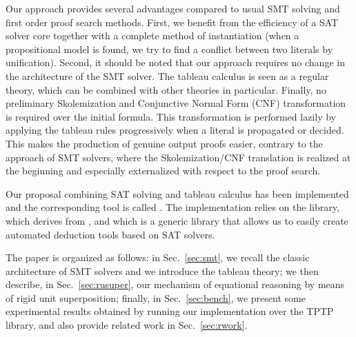 Our approach provides several advantages compared to usual SMT solving and first
order proof search methods. First, we benefit from the efficiency of a SAT
solver core together with a complete method of instantiation (when a
propositional model is found, we try to find a conflict between two literals by
unification). Second, it should be noted that our approach requires no change in
the architecture of the SMT solver. The tableau calculus is seen as a regular
theory, which can be combined with other theories in particular. Finally, no
preliminary Skolemization and Conjunctive Normal Form (CNF) transformation is
required over the initial formula. This transformation is performed lazily by
applying the tableau rules progressively when a literal is propagated or
decided. This makes the production of genuine output proofs easier, contrary to
the approach of SMT solvers, where the Skolemization/CNF translation is realized
at the beginning and especially externalized with respect to the proof search.

Our proposal combining SAT solving and tableau calculus has been implemented and
the corresponding tool is called \archsat{}. The implementation relies on the
\msat{} library, which derives from \altergoz{}, and which is a generic library
that allows us to easily create automated deduction tools based on SAT solvers.


The paper is organized as follows: in Sec.~\ref{sec:smt}, we recall the classic
architecture of SMT solvers and we introduce the tableau theory; we then
describe, in Sec.~\ref{sec:rusuper}, our mechanism of equational reasoning by
means of rigid unit superposition; finally, in Sec.~\ref{sec:bench}, we present
some experimental results obtained by running our implementation over the TPTP
library, and also provide related work in Sec.~\ref{sec:rwork}.
